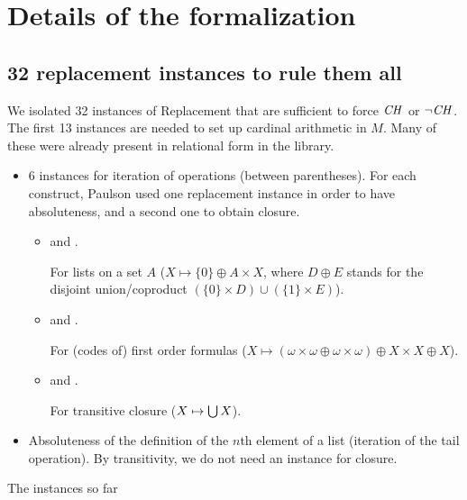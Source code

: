 \section{Details of the formalization}

\subsection{32 replacement instances to rule them all}
\label{sec:repl-instances}

We isolated 32 instances of Replacement that are sufficient to force
$\mathit{CH}$ or $\neg\mathit{CH}$. The first 13 instances are needed to set up
cardinal arithmetic in $M$. Many of these were already present in
relational form in the  library.

\begin{itemize}
\item 6 instances for iteration of operations (between parentheses). For each construct,
  Paulson used one replacement instance in order to have absoluteness,
  and a second one to obtain closure.
  \begin{itemize}
  \item
     and 
    .
    
    For lists on a set $A$ ($X\mapsto \{0 \} \oplus A \times X$, where
    $D\oplus E$ stands for the disjoint union/coproduct $(\{0 \}\times
    D) \cup (\{1 \}\times E)$).
  \item
     and
    .
    
    For (codes of) first order formulas ($X\mapsto (\omega \times
    \omega \oplus \omega \times \omega) \oplus X \times X \oplus X$).
  \item
     and 
    .

    For transitive closure ($X\mapsto\mathop{\textstyle\bigcup} X$).
  \end{itemize}
\item {}

  Absoluteness of the definition of the
  $n$th element of a list (iteration of the tail operation).
  By transitivity, we do not need an instance for closure.
\end{itemize}
The instances so far
